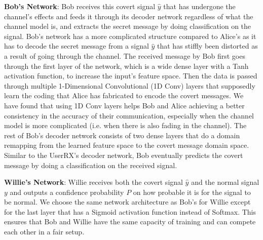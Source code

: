 \textbf{Bob's Network}: Bob receives this covert signal \(\hat{y}\) that has undergone the channel's effects and feeds it through its decoder network regardless of what the channel model is, and extracts the secret message by doing classification on the signal. Bob's network has a more complicated structure compared to Alice's as it has to decode the secret message from a signal \(\hat{y}\) that has stiffly been distorted as a result of going through the channel. The received message by Bob first goes through the first layer of the network, which is a wide dense layer with a Tanh activation function, to increase the input's feature space. Then the data is passed through multiple 1-Dimensional Convolutional (1D Conv) layers that supposedly learn the coding that Alice has fabricated to encode the covert messages. We have found that using 1D Conv layers helps Bob and Alice achieving a better consistency in the accuracy of their communication, especially when the channel model is more complicated (i.e. when there is also fading in the channel). The rest of Bob's decoder network consists of two dense layers that do a domain remapping from the learned feature space to the covert message domain space. Similar to the UserRX's decoder network, Bob eventually predicts the covert message by doing a classification on the received signal.


\textbf{Willie's Network}: Willie receives both the covert signal \(\hat{y}\) and the normal signal \(y\) and outputs a confidence probability \(P\) on how probable it is for the signal to be normal. We choose the same network architecture as Bob's for Willie except for the last layer that has a Sigmoid activation function instead of Softmax. This ensures that Bob and Willie have the same capacity of training and can compete each other in a fair setup.


